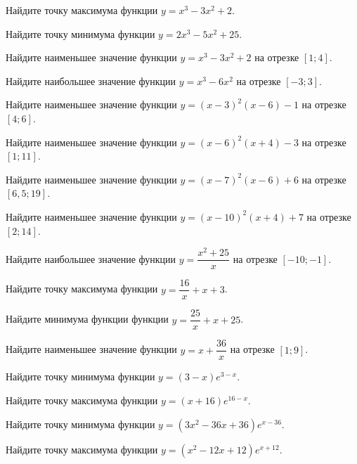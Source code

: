 \begin{class}[number=3]
	\begin{listofex}
		\item Найдите точку максимума функции \( y=x^3-3x^2+2 \).
		\item Найдите точку минимума функции \( y=2x^3-5x^2+25 \).
		\item Найдите наименьшее значение функции \(y=x^3-3x^2+2\) на отрезке \( [1;4] \).
		\item Найдите наибольшее значение функции \(y=x^3-6x^2\) на отрезке \( [-3;3] \).
		
		\item Найдите наименьшее значение функции \( y=(x-3)^2(x-6)-1 \) на отрезке \( [4;6] \).
		\item Найдите наименьшее значение функции \( y=(x-6)^2(x+4)-3 \) на отрезке \( [1;11] \).
		\item Найдите наименьшее значение функции \( y=(x-7)^2(x-6)+6 \) на отрезке \( [6,5;19] \).
		\item Найдите наименьшее значение функции \( y=(x-10)^2(x+4)+7 \) на отрезке \( [2;14] \).
		
		\item Найдите наибольшее значение функции \( y=\dfrac{ x^2+25 }{ x } \) на отрезке \( [-10;-1] \).
		\item Найдите точку максимума функции \( y=\dfrac{ 16 }{ x }+x+3 \).
		\item Найдите минимума функции функции \( y=\dfrac{ 25 }{ x }+x+25 \).
		\item Найдите наименьшее значение функции \( y=x+\dfrac{ 36 }{ x } \) на отрезке \( [1;9] \).
		
		\item Найдите точку минимума функции \( y=(3-x)e^{3-x} \).
		\item Найдите точку максимума функции \( y=(x+16)e^{16-x} \).
		\item Найдите точку минимума функции \( y=(3x^2-36x+36)e^{x-36} \).
		\item Найдите точку максимума функции \( y=(x^2-12x+12)e^{x+12} \).
		
		
		

\end{listofex}
\end{class}
